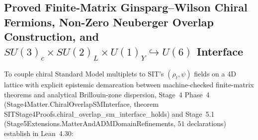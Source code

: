\documentclass[american,11pt,letterpaper]{article}
\def\texttt#1{#1}%
\begin{document}
\subsection{Proved Finite-Matrix Ginsparg--Wilson Chiral Fermions, Non-Zero Neuberger Overlap Construction, and $SU(3)_c\times SU(2)_L\times U(1)_Y \hookrightarrow U(6)$ Interface}

To couple chiral Standard Model multiplets to SIT's $(\rho_t, \psi)$ fields on a 4D lattice with explicit epistemic demarcation between machine-checked finite-matrix theorems and analytical Brillouin-zone dispersion, Stage~4 Phase~4 (\texttt{Stage4\allowbreak{}Matter.\allowbreak{}Chiral\allowbreak{}Overlap\allowbreak{}SMInterface}, theorem \texttt{SITStage4\allowbreak{}Proofs.\allowbreak{}chiral\_\allowbreak{}overlap\_\allowbreak{}sm\_\allowbreak{}interface\_\allowbreak{}holds}) and Stage~5.1 (\texttt{Stage5\allowbreak{}Extensions.\allowbreak{}Matter\allowbreak{}And\allowbreak{}ADMDomain\allowbreak{}Refinements}, $51$ declarations) establish in Lean~4.30:
\end{document}
